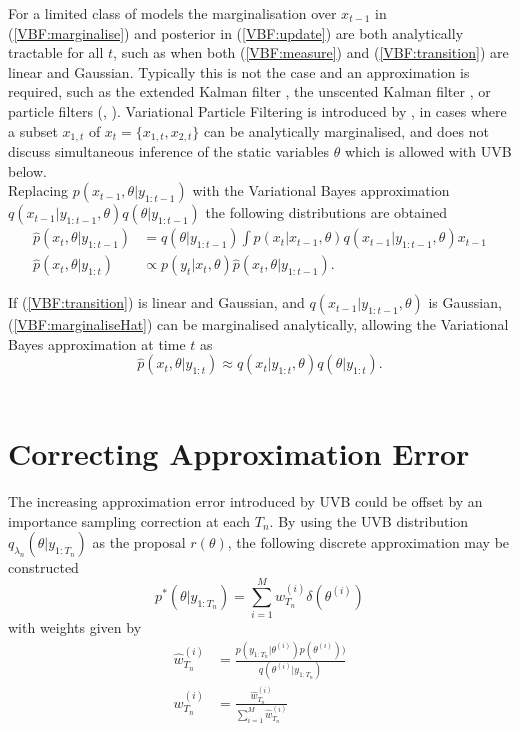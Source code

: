 \documentclass[
12pt, %
onehalfspacing, %
nohyperref, %
headsepline, %
chapterinoneline, %
]{MastersDoctoralThesis} %
\begin{document}
For a limited class of models the marginalisation over $x_{t-1}$ in (\ref{VBF:marginalise}) and posterior in (\ref{VBF:update}) are both analytically tractable for all $t$, such as when both (\ref{VBF:measure}) and (\ref{VBF:transition}) are linear and Gaussian. Typically this is not the case and an approximation is required, such as the extended Kalman filter \citep{Anderson1979}, the unscented Kalman filter \citep{Wan2000}, or particle filters (\cite{Doucet2000}, \cite{Arulampalam2002}). Variational Particle Filtering is introduced by \citet{Smidl2008}, in cases where a subset $x_{1, t}$ of $x_t = \{x_{1, t}, x_{2, t}\}$ can be analytically marginalised, and does not discuss simultaneous inference of the static variables $\theta$ which is allowed with UVB below.
\\

Replacing $p(x_{t-1}, \theta | y_{1:t-1})$ with the Variational Bayes approximation \newline $q(x_{t-1} | y_{1:t-1}, \theta)q(\theta|y_{1:t-1})$ the following distributions are obtained 
\begin{align}
\hat{p}(x_t, \theta | y_{1:t-1}) &= q(\theta | y_{1:t-1}) \int p(x_t | x_{t-1}, \theta) q(x_{t-1} | y_{1:t-1}, \theta)x_{t-1} \label{VBF:marginaliseHat} \\
\hat{p}(x_t, \theta | y_{1:t}) &\propto p(y_t | x_t, \theta)\hat{p}(x_t, \theta | y_{1:t-1}). \label{VBF:updateHat}
\end{align}

If (\ref{VBF:transition}) is linear and Gaussian, and  $q(x_{t-1} | y_{1:t-1}, \theta)$ is Gaussian, (\ref{VBF:marginaliseHat}) can be marginalised analytically, allowing the Variational Bayes approximation at time $t$ as
\begin{equation}
\label{VBF:UVBfilter}
\hat{p}(x_t, \theta | y_{1:t}) \approx q(x_{t} | y_{1:t}, \theta)q(\theta|y_{1:t}).
\end{equation}
\\

\section{Correcting Approximation Error} \label{sec:UVBCorrection}

The increasing approximation error introduced by UVB could be offset by an importance sampling correction at each $T_n$. By using the UVB distribution $q_{\lambda_n}(\theta | y_{1:T_n})$ as the proposal $r(\theta)$, the following discrete approximation may be constructed
\begin{equation}
\label{UVBIS:Approx}
p^*(\theta | y_{1:T_n}) = \sum_{i=1}^M w^{(i)}_{T_n} \delta(\theta^{(i)})
\end{equation}
with weights given by
\begin{align}
\hat{w}^{(i)}_{T_n} &= \frac{p(y_{1:T_n} | \theta^{(i)}) p(\theta^{(i)}))}{q(\theta^{(i)} | y_{1:T_n})} \label{UVBIS:Weights} \\
w^{(i)}_{T_n} &= \frac{\hat{w}^{(i)}_{T_n}}{\sum_{i=1}^M \hat{w}^{(i)}_{T_n}} \label{UVBIS:WeightsNorm}
\end{align}
\\
\end{document}
